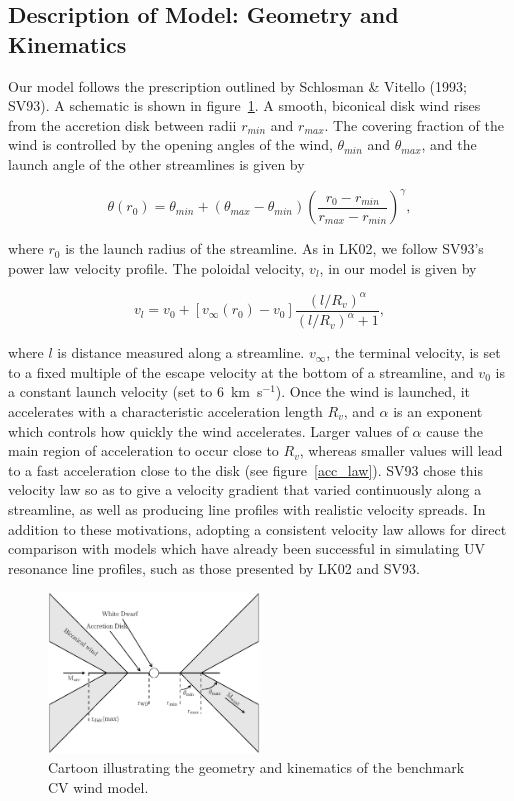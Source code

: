 \documentclass[preprint, a4paper, 11pt]{aastex}
\begin{document}
\subsection{Description of Model: Geometry and Kinematics}

Our model follows the prescription outlined by Schlosman \& Vitello (1993; SV93). A schematic is shown
in figure~\ref{cartoon}. A smooth, biconical
disk wind rises from the accretion disk between radii $r_{min}$ and $r_{max}$. The covering fraction of the wind is 
controlled by the opening angles of the wind, $\theta_{min}$ and $\theta_{max}$, and the launch angle of
the other streamlines is given by

\begin{equation}
\theta(r_0) = \theta_{min} + (\theta_{max} - \theta_{min}) \left(\frac{r_0 - r_{min}}{r_{max} - r_{min}} \right)^{\gamma},
\label{theta}
\end{equation}

where $r_0$ is the launch radius of the streamline.
As in LK02, we follow SV93's power law
velocity profile. The poloidal velocity, $v_l$, in our model is given by

\begin{equation}
v_l=v_0+\left[v_{\infty}(r_0)-v_0\right]\frac{\left(l/R_v\right)^{\alpha}}{\left(l/R_v\right)^{\alpha}+1},
\label{v_law}
\end{equation}

where $l$ is distance measured along a  streamline. $v_{\infty}$, the 
terminal velocity, is set to a fixed multiple of the escape velocity at the bottom
of a streamline, and $v_0$ is a constant launch velocity (set to $6$~km~s$^{-1}$).
Once the wind is launched, it accelerates with a characteristic acceleration
length $R_v$, and $\alpha$ is an exponent which controls how quickly the 
wind accelerates. Larger values of $\alpha$ cause the main region of 
acceleration to occur close to $R_v$, whereas smaller values will lead
to a fast acceleration close to the disk (see figure~\ref{acc_law}).
SV93 chose this velocity law so as to give a 
velocity gradient that varied continuously along a streamline, as well
as producing line profiles with realistic velocity spreads.
In addition to these motivations, adopting a consistent velocity law 
allows for direct comparison with models which have already been successful in 
simulating UV resonance line profiles, such as those presented by LK02 and SV93.  


\begin{figure}
\centering
\includegraphics[width=0.5\textwidth]{figures/fig2_cartoon.eps}
\caption{Cartoon illustrating the geometry and kinematics of the benchmark CV wind model.}
\label{cartoon}
\end{figure}
\end{document}
